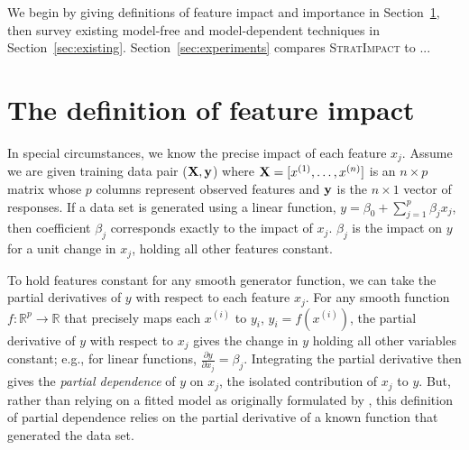\documentclass[11pt]{article}
\newcommand{\secref}[1]{Section~\ref{#1}}
\newcommand{\cut}[1]{}
\newcommand{\todo}[1]{{{\color{red}{[#1]}}}}
\newcommand{\simp}{\fontfamily{cmr}\textsc{\small StratImpact}}
\renewcommand{\xi}{x^{(i)}}
\begin{document}
We begin by giving definitions of feature impact and importance in \secref{sec:def}, then survey  existing model-free and model-dependent techniques in \secref{sec:existing}. \secref{sec:experiments} compares \simp{} to ... \todo{finish walkthrough}

\section{The definition of feature impact}\label{sec:def}

\cut{Practitioners loosely define feature importance as feature predictiveness, which presupposes a fitted predictive model, probably because importances are so often used for feature selection during model development.  Research  focuses on more accurately identifying the impact of features upon model predictions.  But, relying on a fitted model makes it difficult to tease apart the true feature importance from the ability of the model to exploit that feature for prediction purposes. Rather than measuring feature impact on {\em model predictions}, we propose avoiding the model completely to define feature importance as the average impact of a feature on the {\em data set response values}.}

In special circumstances, we know the precise impact of each feature $x_j$. Assume we are given training data pair ($\bf X, y$) where ${\bf X} = [x^{(1)}, \ldots, x^{(n)}]$ is an $n \times p$ matrix whose $p$ columns represent observed features and ${\bf y}$ is the $n \times 1$ vector of responses.  If a data set is generated using a linear function, $y = \beta_0 + \sum_{j=1}^p \beta_j x_j$, \todo{assumes independence of $x_j$?} then coefficient $\beta_j$ corresponds exactly to the impact of $x_j$.  $\beta_j$ is the impact on $y$ for a unit change in $x_j$, holding all other features constant.

To hold features constant for any smooth generator function, we can take the partial derivatives of $y$ with respect to each feature $x_j$. For any smooth function $f:\mathbb{R}^{p} \rightarrow \mathbb{R}$ that precisely maps each $\xi$ to $y_i$, ${y_i} = f(\xi)$, \todo{should that be $y^{(i)}$ to be consistent?} the partial derivative of $y$ with respect to $x_j$ gives the change in $y$ holding all other variables constant; e.g., for linear functions, $\frac{\partial y}{\partial x_j}=\beta_j$. Integrating the partial derivative then gives the {\em partial dependence}  of $y$ on $x_j$, the isolated contribution of $x_j$ to $y$. But, rather than relying on a fitted model as originally formulated by \citep{PDP}, this definition of partial dependence relies on the partial derivative of a known function that generated the data set.
\end{document}
